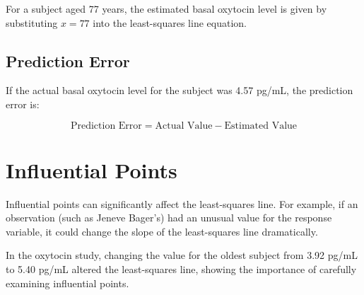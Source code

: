 \documentclass{article}
\begin{document}
For a subject aged 77 years, the estimated basal oxytocin level is given by substituting \( x = 77 \) into the least-squares line equation.

\subsection{Prediction Error}

If the actual basal oxytocin level for the subject was 4.57 pg/mL, the prediction error is:

\[
\text{Prediction Error} = \text{Actual Value} - \text{Estimated Value}
\]

\section{Influential Points}

Influential points can significantly affect the least-squares line. For example, if an observation (such as Jeneve Bager's) had an unusual value for the response variable, it could change the slope of the least-squares line dramatically. 

In the oxytocin study, changing the value for the oldest subject from 3.92 pg/mL to 5.40 pg/mL altered the least-squares line, showing the importance of carefully examining influential points. 
\end{document}
